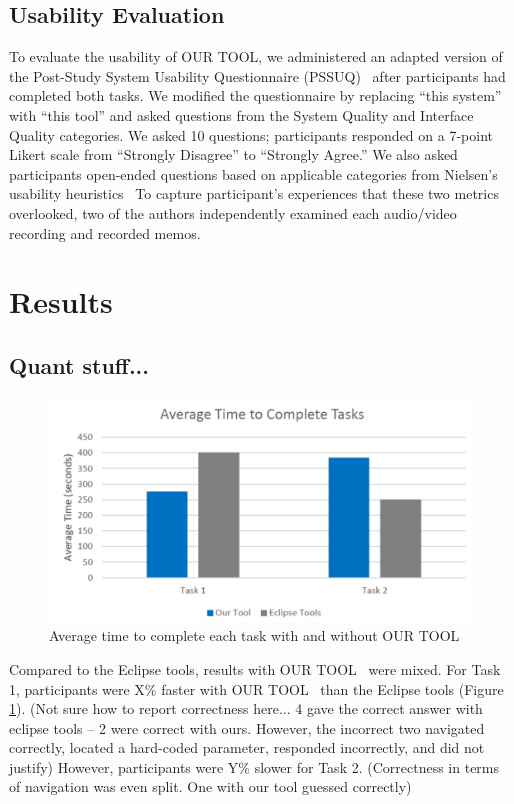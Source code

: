 \documentclass[conference]{IEEEtran}
\newcommand{\toolName}{OUR TOOL}
\begin{document}
\subsection{Usability Evaluation}
To evaluate the usability of \toolName, we administered an adapted version of the Post-Study System Usability Questionnaire (PSSUQ)~\cite{Lewis95ibmcomputer} after participants had completed both tasks. We modified the questionnaire by replacing ``this system'' with ``this tool'' and asked questions from the System Quality and Interface Quality categories. We asked 10 questions; participants responded on a 7-point Likert scale from ``Strongly Disagree'' to ``Strongly Agree.'' 	
We also asked participants open-ended questions based on applicable categories from Nielsen's usability heuristics~\cite{Nielsen1992}
To capture participant's experiences that these two metrics overlooked, two of the authors independently examined each audio/video recording and recorded memos. 

\section{Results}
\subsection{Quant stuff...}
\begin{figure}
	\centering
	\includegraphics[width=\columnwidth]{images/taskTime}
	\caption{Average time to complete each task with and without \toolName}
	\label{fig:taskTime} 
\end{figure}


Compared to the Eclipse tools, results with \toolName~ were mixed.
For Task 1, participants were X\% faster with \toolName~ than the Eclipse tools (Figure \ref{fig:taskTime}). 
(Not sure how to report correctness here... 4 gave the correct answer with eclipse tools --
2 were correct with ours. However, the incorrect two navigated correctly, located a hard-coded parameter, responded incorrectly, and did not justify)
However, participants were Y\% slower for Task 2.
(Correctness in terms of navigation was even split. One with our tool guessed correctly)
\end{document}
